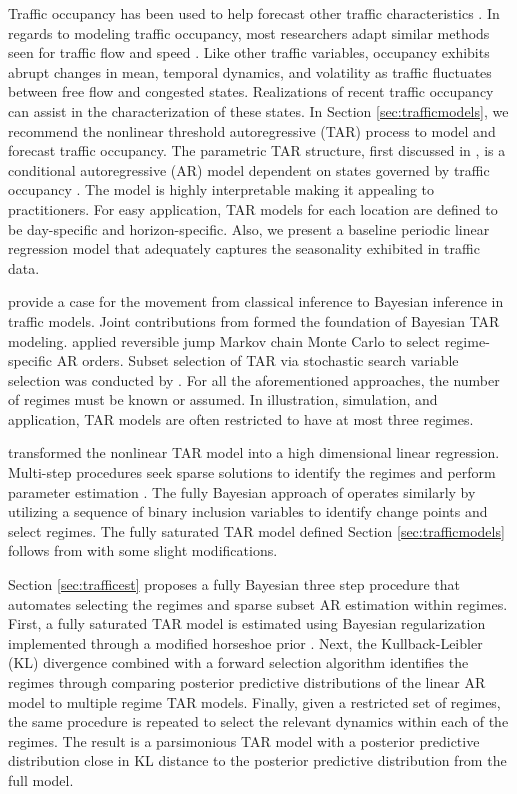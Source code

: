 Traffic occupancy has been used to help forecast other traffic characteristics \citep{Hazelton2004}.  In regards to modeling traffic occupancy, most researchers adapt similar methods seen for traffic flow and speed \citep{Kamarianakis2010}. Like other traffic variables, occupancy exhibits abrupt changes in mean, temporal dynamics, and volatility as traffic fluctuates between free flow and congested states. Realizations of recent traffic occupancy can assist in the characterization of these states. In Section \ref{sec:trafficmodels}, we recommend the nonlinear threshold autoregressive (TAR) process to model and forecast traffic occupancy. The parametric TAR structure, first discussed in \cite{Tong1990}, is a conditional autoregressive (AR) model dependent on states governed by traffic occupancy . The model is highly interpretable making it appealing to practitioners. For easy application, TAR models for each location are defined to be day-specific and horizon-specific. Also, we present a baseline periodic linear regression model that adequately captures the seasonality exhibited in traffic data.

\cite{Ghosh2007} provide a case for the movement from classical inference to Bayesian inference in traffic models. Joint contributions from \cite{Broemeling1992,Geweke1993,Chen1995} formed the foundation of Bayesian TAR modeling. \cite{Campbell2004} applied reversible jump Markov chain Monte Carlo to select regime-specific AR orders. Subset selection of TAR via stochastic search variable selection \citep{George1993} was conducted by \citet{So2003,Chen2011}. For all the aforementioned approaches, the number of regimes must be known or assumed. In illustration, simulation, and application, TAR models are often restricted to have at most three regimes. 

\cite{Chan2015} transformed the nonlinear TAR model into a high dimensional linear regression. Multi-step procedures seek sparse solutions to identify the regimes and perform parameter estimation \citep{Chan2015,Chan2017}. The fully Bayesian approach of \cite{Pan2017} operates similarly by utilizing a sequence of binary inclusion variables to identify change points and select regimes. The fully saturated TAR model defined Section \ref{sec:trafficmodels} follows from \cite{Chan2015} with some slight modifications. 

Section \ref{sec:trafficest} proposes a fully Bayesian three step  procedure that automates selecting the regimes and sparse subset AR estimation within regimes. First, a fully saturated TAR model is estimated using Bayesian regularization implemented through a modified horseshoe prior \citep{Carvalho2009,Carvalho2010,Bhadra2016}. Next, the Kullback-Leibler (KL) divergence \citep{Kullback1951} combined with a forward selection algorithm identifies the regimes through comparing posterior predictive distributions of the linear AR model to multiple regime TAR models. Finally, given a restricted set of regimes, the same procedure is repeated to select the relevant dynamics within each of the regimes. The result is a parsimonious TAR model with a posterior predictive distribution close in KL distance to the posterior predictive distribution from the full model.

